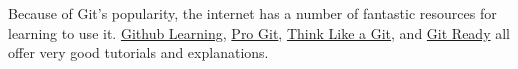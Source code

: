 Because of Git's popularity, the internet has a number of fantastic resources for learning to use it. \href{http://learn.Github.com/p/index.html}{Github Learning}, \href{http://git-scm.com/book}{Pro Git}, \href{http://think-like-a-git.net/}{Think Like a Git}, and \href{http://gitready.com/}{Git Ready} all offer very good tutorials and explanations.